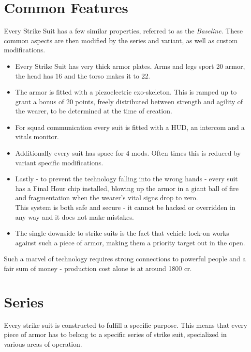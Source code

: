 \documentclass[12pt,a4paper,openany]{book}
\begin{document}
	\section{Common Features}
	Every Strike Suit has a few similar properties, referred to as the \emph{Baseline}. These common aspects are then modified by the series and variant, as well as custom modifications.\par
	\begin{itemize}
		\item Every Strike Suit has very thick armor plates. Arms and legs sport 20 armor, the head has 16 and the torso makes it to 22.
		\item The armor is fitted with a piezoelectric exo-skeleton. This is ramped up to grant a bonus of 20 points, freely distributed between strength and agility of the wearer, to be determined at the time of creation.
		\item For squad communication every suit is fitted with a HUD, an intercom and a vitals monitor.
		\item Additionally every suit has space for 4 mods. Often times this is reduced by variant specific modifications.
		\item Lastly - to prevent the technology falling into the wrong hands - every suit has a Final Hour chip installed, blowing up the armor in a giant ball of fire and fragmentation when the wearer's vital signs drop to zero.\\
		This system is both safe and secure - it cannot be hacked or overridden in any way and it does not make mistakes.
		\item The single downside to strike suits is the fact that vehicle lock-on works against such a piece of armor, making them a priority target out in the open.
	\end{itemize}
	\par
	Such a marvel of technology requires strong connections to powerful people and a fair sum of money - production cost alone is at around 1800 cr.

	\section{Series}
	Every strike suit is constructed to fulfill a specific purpose. This means that every piece of armor has to belong to a specific series of strike suit, specialized in various areas of operation.
	
\end{document}
